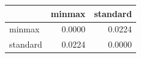 \begin{tabular}{lrr}
\toprule
 & minmax & standard \\
\midrule
minmax & 0.0000 & 0.0224 \\
standard & 0.0224 & 0.0000 \\
\bottomrule
\end{tabular}
